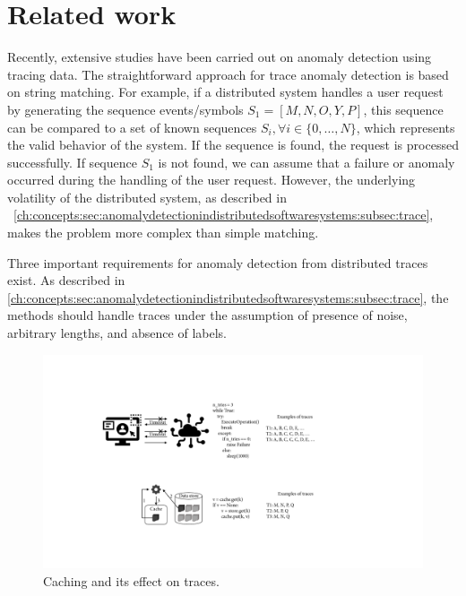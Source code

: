 \section{Related work}
Recently, extensive studies have been carried out on anomaly detection using tracing data. The straightforward approach for trace anomaly detection is based on string matching. For example, if a distributed system handles a user request by generating the sequence events/symbols $S_{1} = [M, N, O, Y, P]$, this sequence can be compared to a set of known sequences $S_{i}, \forall i\in \{0,\dots, N\}$, which represents the valid behavior of the system. If the sequence is found, the request is processed successfully. If sequence $S_{1}$ is not found, we can assume that a failure or anomaly occurred during the handling of the user request. However, the underlying volatility of the distributed system, as described in ~\autoref{ch:concepts:sec:anomalydetectionindistributedsoftwaresystems:subsec:trace}, makes the problem more complex than simple matching.

Three important requirements for anomaly detection from distributed traces exist. As described in \autoref{ch:concepts:sec:anomalydetectionindistributedsoftwaresystems:subsec:trace}, the methods should handle traces under the assumption of presence of noise, arbitrary lengths, and absence of labels.


\begin{figure}[htbp]
\centerline{\includegraphics[width=1.0\textwidth]{gfx/chap7/cacheasidepattern.pdf}}
\caption{Caching and its effect on traces.}
\label{fig:cacheasidepattern}
\end{figure}

